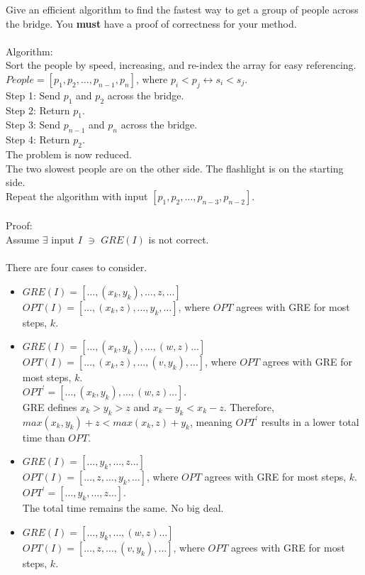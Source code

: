 \documentclass[10pt]{article}
\begin{document}
	\noindent
	Give an efficient algorithm to find the fastest way to get a group of people across the bridge.  You
	\textbf{must} have a proof of correctness for your method.\\
	\\
	Algorithm:\\
	Sort the people by speed, increasing, and re-index the array for easy referencing.\\
	$People = [p_1, p_2, \ldots, p_{n-1}, p_n]$, where $p_i < p_j \leftrightarrow s_i < s_j$.\\
	Step 1: Send $p_1$ and $p_2$ across the bridge.\\
	Step 2: Return $p_1$.\\
	Step 3: Send $p_{n-1}$ and $p_n$ across the bridge.\\
	Step 4: Return $p_2$.\\
	The problem is now reduced.\\
	The two slowest people are on the other side. The flashlight is on the starting side.\\
	Repeat the algorithm with input $[p_1, p_2, \ldots, p_{n-3}, p_{n-2}]$.\\
	\\
	Proof:\\
	Assume $\exists$ input $I$ $\ni$ $GRE(I)$ is not correct.\\
	\\
	There are four cases to consider.\\
	\begin{itemize}
	  \item $GRE(I) = [\ldots, (x_k,y_k), \ldots, z, \ldots]$\\
	  $OPT(I) = [\ldots, (x_k,z), \ldots, y_k, \ldots]$, where $OPT$ agrees with GRE for most steps, $k$.\\
	  
	  \item $GRE(I) = [\ldots, (x_k,y_k), \ldots, (w,z) \ldots]$\\
	  $OPT(I) = [\ldots, (x_k,z), \ldots, (v,y_k), \ldots]$, where $OPT$ agrees with GRE for most steps, $k$.\\
	  $OPT^\prime = [\ldots, (x_k,y_k), \ldots, (w,z) \ldots]$.\\
	  GRE defines $x_k > y_k > z$ and $x_k - y_k < x_k - z$.
	  Therefore, $max(x_k,y_k) + z < max(x_k,z) + y_k$, meaning $OPT^\prime$ results in a lower total time than $OPT$.\\
	  
	  \item $GRE(I) = [\ldots, y_k, \ldots, z \ldots]$\\
	  $OPT(I) = [\ldots, z, \ldots, y_k, \ldots]$, where $OPT$ agrees with GRE for most steps, $k$.\\
	  $OPT^\prime = [\ldots, y_k, \ldots, z \ldots]$.\\
	  The total time remains the same. No big deal.\\
	   
	  \item $GRE(I) = [\ldots, y_k, \ldots, (w,z) \ldots]$\\
	  $OPT(I) = [\ldots, z, \ldots, (v,y_k), \ldots]$, where $OPT$ agrees with GRE for most steps, $k$.\\
	\end{itemize}
\end{document}
